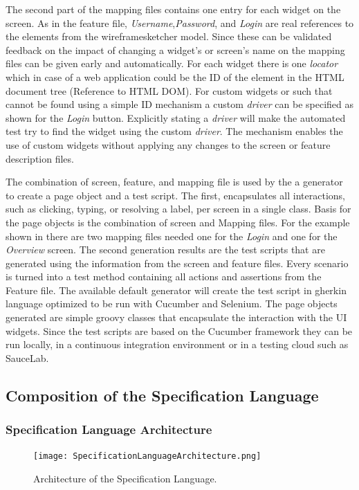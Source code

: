 \documentclass{sig-alternate-05-2015}
\begin{document}
{The second part of the mapping files contains one entry for each widget on the screen.
As in the feature file, \textit{Username},\textit{Password}, and \textit{Login} are real references to the elements from the wireframesketcher model.
Since these can be validated feedback on the impact of changing a widget's or screen's name on the mapping files can be given early and automatically.
For each widget there is one \textit{locator} which in case of a web application could be the ID of the element in the HTML document tree (Reference to HTML DOM).
For custom widgets or such that cannot be found using a simple ID mechanism a custom \textit{driver} can be specified as shown for the \textit{Login} button.
Explicitly stating a \textit{driver} will make the automated test try to find the widget using the custom \textit{driver}. 
The mechanism enables the use of custom widgets without applying any changes to the screen or feature description files.

The combination of screen, feature, and mapping file is used by the a generator to create a page object and a test script.
The first, encapsulates all interactions, such as clicking, typing, or resolving a label, per screen in a single class.
Basis for the page objects is the combination of screen and Mapping files.
For the example shown in  there are two mapping files needed one for the \textit{Login} and one for the \textit{Overview} screen.
The second generation results are the test scripts that are generated using the information from the screen and feature files.
Every scenario is turned into a test method containing all actions and assertions from the Feature file.
The available default generator will create the test script in gherkin language optimized to be run with Cucumber and Selenium.
The page objects generated are simple groovy classes that encapsulate the interaction with the UI widgets.
Since the test scripts are based on the Cucumber framework they can be run locally, in a continuous integration environment or in a testing cloud such as SauceLab.
\subsection{Composition of the Specification Language}
\subsubsection{Specification Language Architecture}
\begin{figure}[h]
	\centering
	\texttt{[image: SpecificationLanguageArchitecture.png]}
	\caption{Architecture of the Specification Language.}
	\label{fig:architectureOverview}
\end{figure}

}
\end{document}
